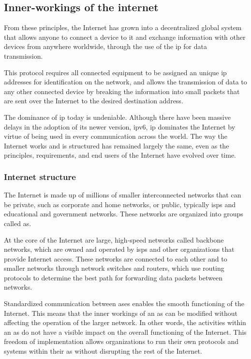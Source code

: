 \subsection{Inner-workings of the internet}

From these principles, the Internet has grown into a decentralized global system that allows anyone to connect a device to it and exchange information with other devices from anywhere worldwide, through the use of the \gls{ip} for data transmission.

This protocol requires all connected equipment to be assigned an unique \gls{ip} addresses for identification on the network, and allows the transmission of data to any other connected device by breaking the information into small packets that are sent over the Internet to the desired destination address.

The dominance of \gls{ip} today is undeniable. Although there have been massive delays in the adoption of its newer version, \gls{ipv6}, \gls{ip} dominates the Internet by virtue of being used in every communication across the world.
The way the Internet works and is structured has remained largely the same, even as the principles, requirements, and end users of the Internet have evolved over time.

\subsubsection{Internet structure}
The Internet is made up of millions of smaller interconnected networks that can be private, such as corporate and home networks, or public, typically \gls{isps} and educational and government networks. These networks are organized into groups called \gls{as}. 

At the core of the Internet are large, high-speed networks called backbone networks, which are owned and operated by \gls{isps} and other organizations that provide Internet access. These networks are connected to each other and to smaller networks through network switches and routers, which use routing protocols to determine the best path for forwarding data packets between networks.

Standardized communication between \gls{as}es enables the smooth functioning of the Internet. This means that the inner workings of an \gls{as} can be modified without affecting the operation of the larger network. In other words, the activities within an \gls{as} do not have a visible impact on the overall functioning of the Internet. This freedom of implementation allows organizations to run their own protocols and systems within their \gls{as} without disrupting the rest of the Internet.

